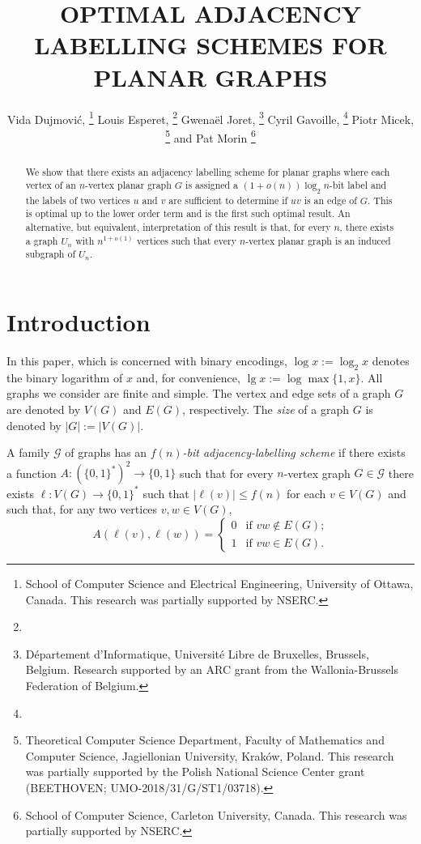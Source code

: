 \documentclass[kpfonts]{patmorin}
\title{\MakeUppercase{Optimal Adjacency Labelling Schemes for Planar Graphs}}
\author{
  Vida Dujmović,%
    \thanks{School of Computer Science and Electrical Engineering, University of Ottawa, Canada. This research was partially supported by NSERC.}\quad
  Louis Esperet,%
    \thanks{}\quad
  Gwenaël Joret,%
    \thanks{Département d'Informatique, Université Libre de Bruxelles, Brussels, Belgium. Research supported by an ARC grant from the Wallonia-Brussels Federation of Belgium.}\quad
  Cyril Gavoille,%
    \thanks{}\quad
  Piotr Micek,%
    \thanks{Theoretical Computer Science Department, Faculty of Mathematics and Computer Science, Jagiellonian University, Krak\'{o}w, Poland. This research was partially supported by the Polish National Science Center grant (BEETHOVEN; UMO-2018/31/G/ST1/03718).}\newline
  and Pat Morin%
    \thanks{School of Computer Science, Carleton University, Canada. This research was partially supported by NSERC.}
}
\begin{document}
\begin{titlepage}
\maketitle

\begin{abstract}
  We show that there exists an adjacency labelling scheme for planar graphs where each vertex of an $n$-vertex planar graph $G$ is assigned a $(1+o(n))\log_2 n$-bit label and the labels of two vertices $u$ and $v$ are sufficient to determine if $uv$ is an edge of $G$.  This is optimal up to the lower order term and is the first such optimal result.  An alternative, but equivalent, interpretation of this result is that, for every $n$, there exists a graph $U_n$ with $n^{1+o(1)}$ vertices such that every $n$-vertex planar graph is an induced subgraph of $U_n$.  
%  
\end{abstract}
\end{titlepage}
\tableofcontents

\newpage

\setcounter{page}{0}
\section{Introduction}

In this paper, which is concerned with binary encodings, $\log x:=\log_2 x$ denotes the binary logarithm of $x$ and, for convenience, $\lg x := \log\max\{1,x\}$.  All graphs we consider are finite and simple.  The vertex and edge sets of a graph $G$ are denoted by $V(G)$ and $E(G)$, respectively.  The \emph{size} of a graph $G$ is denoted by $|G|:=|V(G)|$.

A family $\mathcal{G}$ of graphs has an \emph{$f(n)$-bit adjacency-labelling scheme} if there exists a function $A:(\{0,1\}^*)^2\to \{0,1\}$ such that for every $n$-vertex graph $G\in \mathcal{G}$ there exists $\ell:V(G)\to\{0,1\}^*$ such that $|\ell(v)|\le f(n)$ for each $v\in V(G)$ and such that, for any two vertices $v,w\in V(G)$,
\[  A(\ell(v),\ell(w)) = 
      \begin{cases} 
        0 & \text{if $vw\not\in E(G)$;} \\
        1 & \text{if $vw\in E(G)$.}
      \end{cases}
\]
\end{document}
